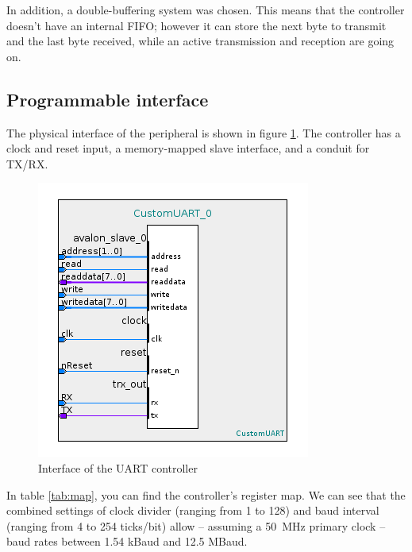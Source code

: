 \documentclass[12pt,a4paper]{article}
\begin{document}
In addition, a double-buffering system was chosen. This means that the controller doesn't have an internal FIFO; however it can store the next byte to transmit and the last byte received, while an active transmission and reception are going on.

\subsection{Programmable interface}

The physical interface of the peripheral is shown in figure \ref{fig:interface}. The controller has a clock and reset input, a memory-mapped slave interface, and a conduit for TX/RX.

\begin{figure}[h]
	\centering
	\includegraphics[width=.5\textwidth]{interface}
	\caption{Interface of the UART controller}
	\label{fig:interface}
\end{figure}

In table \ref{tab:map}, you can find the controller's register map.
We can see that the combined settings of clock divider (ranging from 1 to 128) and baud interval (ranging from 4 to 254 ticks/bit) allow -- assuming a \SI{50}{\mega\hertz} primary clock -- baud rates between 1.54 kBaud and 12.5 MBaud.
\end{document}

